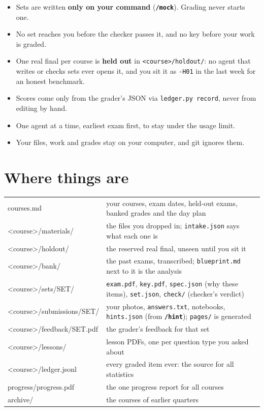 \documentclass[a4paper,10pt]{article}
\newcommand{\cmd}[1]{\texttt{\bfseries #1}}
\begin{document}
\begin{note}
\begin{itemize}
  \item Sets are written \textbf{only on your command} (\cmd{/mock}). Grading never starts one.
  \item No set reaches you before the checker passes it, and no key before your work is graded.
  \item One real final per course is \textbf{held out} in \texttt{<course>/holdout/}: no agent that
    writes or checks sets ever opens it, and you sit it as \texttt{-H01} in the last week for an honest benchmark.
  \item Scores come only from the grader's JSON via \texttt{ledger.py record}, never from editing by hand.
  \item One agent at a time, earliest exam first, to stay under the usage limit.
  \item Your files, work and grades stay on your computer, and git ignores them.
\end{itemize}
\end{note}

\section{Where things are}

\begin{tabularx}{\linewidth}{@{}>{\ttfamily}l X@{}}
\toprule
courses.md & your courses, exam dates, held-out exams, banked grades and the day plan \\
<course>/materials/ & the files you dropped in; \texttt{intake.json} says what each one is \\
<course>/holdout/ & the reserved real final, unseen until you sit it \\
<course>/bank/ & the past exams, transcribed; \texttt{blueprint.md} next to it is the analysis \\
<course>/sets/SET/ & \texttt{exam.pdf}, \texttt{key.pdf}, \texttt{spec.json} (why these items), \texttt{set.json}, \texttt{check/} (checker's verdict) \\
<course>/submissions/SET/ & your photos, \texttt{answers.txt}, notebooks, \texttt{hints.json} (from \cmd{/hint}); \texttt{pages/} is generated \\
<course>/feedback/SET.pdf & the grader's feedback for that set \\
<course>/lessons/ & lesson PDFs, one per question type you asked about \\
<course>/ledger.jsonl & every graded item ever: the source for all statistics \\
progress/progress.pdf & the one progress report for all courses \\
archive/ & the courses of earlier quarters \\
\bottomrule
\end{tabularx}
\end{document}
